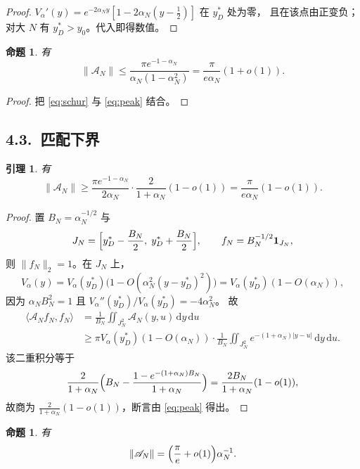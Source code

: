 \documentclass[12pt,a4paper]{amsart}
\numberwithin{equation}{section}
\theoremstyle{plain}
\newtheorem{proposition}[theorem]{命题}
\newtheorem{lemma}[theorem]{引理}
\theoremstyle{definition}
\newcommand{\dd}{\,\mathrm{d}}
\begin{document}
\begin{proof}
$V_\alpha'(y)=e^{-2\alpha_Ny}[1-2\alpha_N(y-\frac12)]$ 在 $y_D^*$ 处为零，
且在该点由正变负；对大 $N$ 有 $y_D^*>y_0$。代入即得数值。
\end{proof}

\begin{proposition}\label{prop:schur}
有
\begin{equation}\label{eq:upper}
 \|\mathscr A_N\|\le\frac{\pi e^{-1-\alpha_N}}{\alpha_N(1-\alpha_N^2)}
 =\frac{\pi}{e\alpha_N}(1+o(1)).
\end{equation}
\end{proposition}

\begin{proof}
把 \eqref{eq:schur} 与 \eqref{eq:peak} 结合。
\end{proof}

\subsection*{4.3.\ 匹配下界}

\begin{lemma}\label{lem:lower}
有
\begin{equation}\label{eq:lower}
 \|\mathscr A_N\|\ge\frac{\pi e^{-1-\alpha_N}}{2\alpha_N}
 \cdot\frac{2}{1+\alpha_N}(1-o(1))
 =\frac{\pi}{e\alpha_N}(1-o(1)).
\end{equation}
\end{lemma}

\begin{proof}
置 $B_N=\alpha_N^{-1/2}$ 与
\[
 J_N=\Bigl[y_D^*-\frac{B_N}2,\;y_D^*+\frac{B_N}2\Bigr],
 \qquad f_N=B_N^{-1/2}\mathbf 1_{J_N},
\]
则 $\|f_N\|_2=1$。在 $J_N$ 上，
\[
 V_\alpha(y)=V_\alpha(y_D^*)\bigl(1-O(\alpha_N^2(y-y_D^*)^2)\bigr)
 =V_\alpha(y_D^*)(1-O(\alpha_N)),
\]
因为 $\alpha_NB_N^2=1$ 且 $V_\alpha''(y_D^*)/V_\alpha(y_D^*)=-4\alpha_N^2$。
故
\[
 \begin{aligned}
 \langle\mathscr A_Nf_N,f_N\rangle
 &=\frac1{B_N}\iint_{J_N^2}\mathscr A_N(y,u)\dd y\dd u\\
 &\ge\pi V_\alpha(y_D^*)(1-O(\alpha_N))
 \cdot\frac1{B_N}\iint_{J_N^2}e^{-(1+\alpha_N)|y-u|}\dd y\dd u .
 \end{aligned}
\]
该二重积分等于
\[
 \frac2{1+\alpha_N}\Bigl(B_N-\frac{1-e^{-(1+\alpha_N)B_N}}{1+\alpha_N}\Bigr)
 =\frac{2B_N}{1+\alpha_N}(1-o(1)),
\]
故商为 $\frac{2}{1+\alpha_N}(1-o(1))$，断言由 \eqref{eq:peak} 得出。
\end{proof}

\begin{proposition}\label{prop:modelnorm}
有
\begin{equation}\label{eq:modelnorm}
 \|\mathscr A_N\|=\Bigl(\frac{\pi}{e}+o(1)\Bigr)\alpha_N^{-1}.
\end{equation}
\end{proposition}
\end{document}
